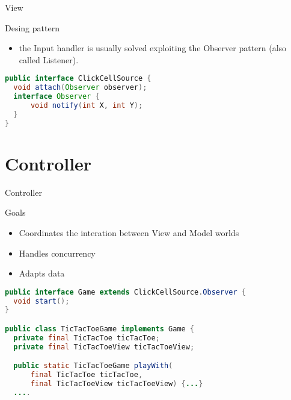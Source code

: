 \documentclass[presentation]{beamer}
\let\oldcite\cite
\renewcommand{\cite}[1]{{\color{blue}\oldcite{#1}}}
\begin{document}
\begin{frame}[fragile]{View}
\begin{block}{Desing pattern}
  \begin{itemize}
    \item the Input handler is usually solved exploiting the Observer \cite{gamma1995design} pattern (also called Listener). 
  \end{itemize}
\end{block}
\begin{lstlisting}[language=Java]
public interface ClickCellSource {
  void attach(Observer observer);
  interface Observer {
      void notify(int X, int Y);
  }
}
\end{lstlisting}
\end{frame}

\section{Controller}
\begin{frame}[fragile]{Controller}
\begin{block}{Goals}
  \begin{itemize}
    \item Coordinates the interation between View and Model worlds
    \item Handles concurrency
    \item Adapts data 
  \end{itemize}
\end{block}

\begin{lstlisting}[language=Java]
public interface Game extends ClickCellSource.Observer {
  void start();
}

public class TicTacToeGame implements Game {
  private final TicTacToe ticTacToe;
  private final TicTacToeView ticTacToeView;

  public static TicTacToeGame playWith(
      final TicTacToe ticTacToe, 
      final TicTacToeView ticTacToeView) {...}
  ....

\end{lstlisting}
\end{frame}
\end{document}
